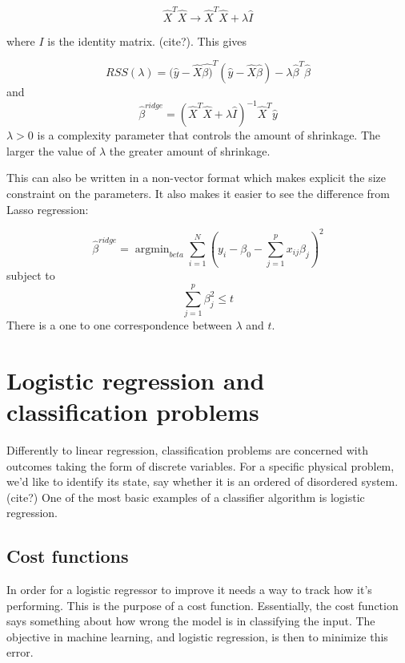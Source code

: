 \begin{equation}
	\hat{X}^T\hat{X} \rightarrow \hat{X}^T\hat{X} + \lambda \hat{I}
\end{equation}

where $I$ is the identity matrix. (cite?).
This gives

\begin{equation}
	RSS(\lambda) = (\hat{y}-\hat{X}\hat{\beta)}^T(\hat{y}
	- \hat{X}\hat{\beta})
	- \lambda \hat{\beta}^T\hat{\beta}
\end{equation}
and
\begin{equation}
	\hat{\beta}^{ridge} = (\hat{X}^T\hat{X}
	+ \lambda \hat{I})^{-1}\hat{X}^T\hat{y}
\end{equation}
\(\lambda > 0 \) is a complexity parameter that controls the amount
of shrinkage. The larger the value of \(\lambda\) the greater amount of
shrinkage.
\cite{James2000}

This can also be written in a non-vector format which makes
explicit the size constraint on the parameters.
It also makes it easier to see the difference from Lasso regression:

\begin{equation}
	\hat{\beta}^{ridge} = \operatorname{argmin}_{beta}
							\sum\limits_{i=1}^N \left(y_i - \beta_0
							-\sum\limits_{j=1}^p x_{ij}\beta_j\right)^2
\end{equation}
subject to
\begin{equation}
	\sum\limits_{j=1}^p \beta_j^2 \leq t
\end{equation}
There is a one to one correspondence between \(\lambda\) and \(t\).
\cite{James2000}

\section{Logistic regression and classification problems}\label{seq:logistic}
Differently to linear regression, classification problems
are concerned with outcomes taking the form of discrete variables.
For a specific physical problem, we'd like to identify its state, say whether
it is an ordered of disordered system. (cite?) One of the most basic examples
of a classifier algorithm is logistic regression.

\subsection{Cost functions}\label{seq:cost}
In order for a logistic regressor to improve it needs a way to
track how it's performing. This is the purpose of a cost function. Essentially,
the cost function says something about how wrong the model is in classifying the
input. The objective in machine learning, and logistic regression, is then to minimize
this error.

